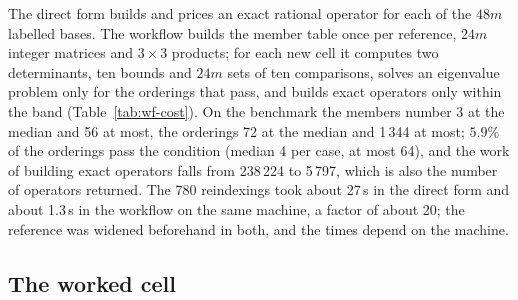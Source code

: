 \documentclass[preprint,pdf]{iucr}          %
\begin{document}
The direct form builds and prices an exact rational operator for each of the $48m$ labelled bases. The workflow builds the member table once per reference, $24m$ integer matrices and $3\times3$ products; for each new cell it computes two determinants, ten bounds and $24m$ sets of ten comparisons, solves an eigenvalue problem only for the orderings that pass, and builds exact operators only within the band (Table~\ref{tab:wf-cost}). On the benchmark the members number 3 at the median and 56 at most, the orderings 72 at the median and 1\,344 at most; $5.9\%$ of the orderings pass the condition (median 4 per case, at most 64), and the work of building exact operators falls from 238\,224 to 5\,797, which is also the number of operators returned. The 780 reindexings took about 27\,s in the direct form and about 1.3\,s in the workflow on the same machine, a factor of about 20; the reference was widened beforehand in both, and the times depend on the machine.

\subsection{The worked cell}
\end{document}
